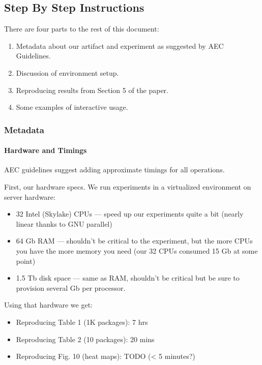 \documentclass[
]{article}
\providecommand{\tightlist}{%
  \setlength{\itemsep}{0pt}\setlength{\parskip}{0pt}}
\begin{document}
\hypertarget{step-by-step-instructions}{%
\subsection{Step By Step Instructions}\label{step-by-step-instructions}}

There are four parts to the rest of this document:

\begin{enumerate}
\def\labelenumi{\arabic{enumi}.}
\item
  Metadata about our artifact and experiment as suggested by AEC
  Guidelines.
\item
  Discussion of environment setup.
\item
  Reproducing results from Section 5 of the paper.
\item
  Some examples of interactive usage.
\end{enumerate}

\hypertarget{metadata}{%
\subsubsection{Metadata}\label{metadata}}

\hypertarget{hardware-and-timings}{%
\paragraph{Hardware and Timings}\label{hardware-and-timings}}

AEC guidelines suggest adding approximate timings for all operations.

First, our hardware specs. We run experiments in a virtualized
environment on server hardware:

\begin{itemize}
\item
  32 Intel (Skylake) CPUs --- speed up our experiments quite a bit
  (nearly linear thanks to GNU parallel)
\item
  64 Gb RAM --- shouldn't be critical to the experiment, but the more
  CPUs you have the more memory you need (our 32 CPUs consumed 15 Gb at
  some point)
\item
  1.5 Tb disk space --- same as RAM, shouldn't be critical but be sure to
  provision several Gb per processor.
\end{itemize}

Using that hardware we get:

\begin{itemize}
\tightlist
\item
  Reproducing Table 1 (1K packages): 7 hrs
\item
  Reproducing Table 2 (10 packages): 20 mins
\item
  Reproducing Fig. 10 (heat maps): TODO (\textless{} 5 minutes?)
\end{itemize}
\end{document}
